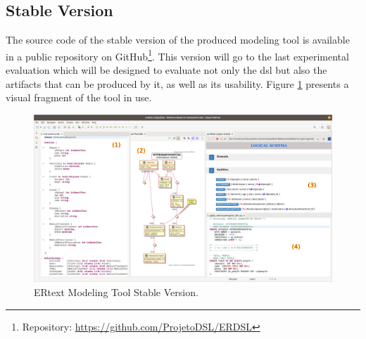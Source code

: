 \subsection{Stable Version}

The source code of the stable version of the produced modeling tool is available in a public repository on GitHub\footnote{Repository: \url{https://github.com/ProjetoDSL/ERDSL}}.
This version will go to the last experimental evaluation which will be designed to evaluate not only the \ac{dsl} but also the artifacts that can be produced by it, as well as its usability.
Figure \ref{fig:stableVersion} presents a visual fragment of the tool in use.

\begin{figure} [!htb]
    \centering
    \caption{ERtext Modeling Tool Stable Version.}
    \label{fig:stableVersion}
    \includegraphics[width=1\textwidth]{img/ToolOverview2.png}
\end{figure}

